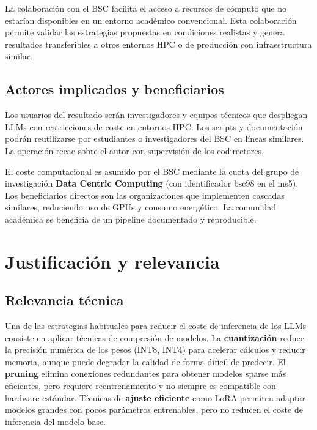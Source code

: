 \documentclass[11pt,a4paper]{article}
\begin{document}
La colaboración con el BSC facilita el acceso a recursos de cómputo que no estarían disponibles en un entorno académico convencional. Esta colaboración permite validar las estrategias propuestas en condiciones realistas y genera resultados transferibles a otros entornos HPC o de producción con infraestructura similar.

\subsection{Actores implicados y beneficiarios}

Los usuarios del resultado serán investigadores y equipos técnicos que despliegan LLMs con restricciones de coste en entornos HPC. Los scripts y documentación podrán reutilizarse por estudiantes o investigadores del BSC en líneas similares. La operación recae sobre el autor con supervisión de los codirectores.

El coste computacional es asumido por el BSC mediante la cuota del grupo de investigación \textbf{Data Centric Computing} (con identificador bsc98 en el ms5). Los beneficiarios directos son las organizaciones que implementen cascadas similares, reduciendo uso de GPUs y consumo energético. La comunidad académica se beneficia de un pipeline documentado y reproducible.

\section{Justificación y relevancia}

\subsection{Relevancia técnica}

Una de las estrategias habituales para reducir el coste de inferencia de los LLMs consiste en aplicar técnicas de compresión de modelos. La \textbf{cuantización} reduce la precisión numérica de los pesos (INT8, INT4) para acelerar cálculos y reducir memoria, aunque puede degradar la calidad de forma difícil de predecir. El \textbf{pruning} elimina conexiones redundantes para obtener modelos sparse más eficientes, pero requiere reentrenamiento y no siempre es compatible con hardware estándar. Técnicas de \textbf{ajuste eficiente} como LoRA permiten adaptar modelos grandes con pocos parámetros entrenables, pero no reducen el coste de inferencia del modelo base.
\end{document}
